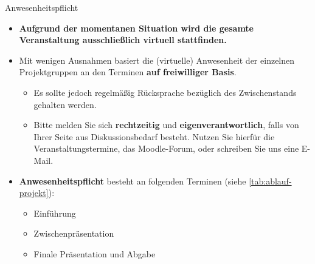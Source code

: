 \begin{dwHeaderFrame}{Anwesenheitspflicht}
	\begin{itemize}
		\item \textbf{Aufgrund der momentanen Situation wird die gesamte Veranstaltung ausschließlich virtuell stattfinden.}
		\item Mit wenigen Ausnahmen basiert die (virtuelle) Anwesenheit der einzelnen Projektgruppen an den Terminen \textbf{auf freiwilliger Basis}.
		\begin{itemize}
			\item Es sollte jedoch regelmäßig Rücksprache bezüglich des Zwischenstands gehalten werden.
			\item Bitte melden Sie sich \textbf{rechtzeitig} und \textbf{eigenverantwortlich},
				falls von Ihrer Seite aus Diskussionsbedarf besteht. Nutzen Sie hierfür die Veranstaltungstermine, das Moodle-Forum,
				oder schreiben Sie uns eine E-Mail.
		\end{itemize}
		\item \textbf{Anwesenheitspflicht} besteht an folgenden Terminen (siehe \cref{tab:ablauf-projekt}):
		\begin{itemize}
			\item Einführung
			\item Zwischenpräsentation
			\item Finale Präsentation und Abgabe
		\end{itemize}
	\end{itemize}
\end{dwHeaderFrame}


